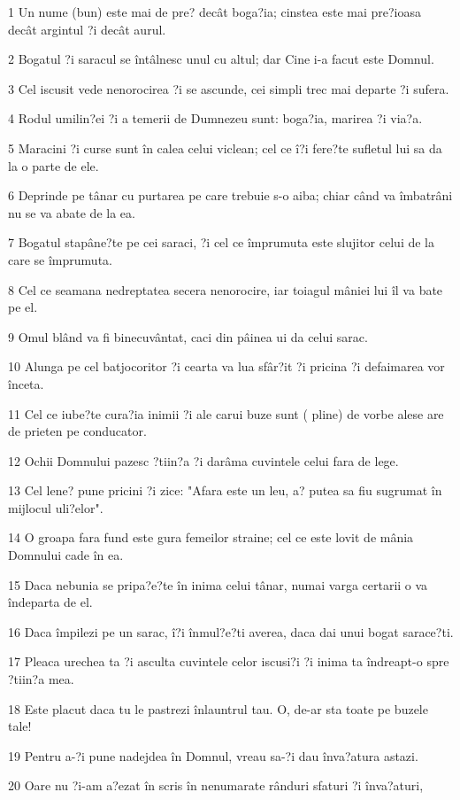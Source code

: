 \par 1 Un nume (bun) este mai de pre? decât boga?ia; cinstea este mai pre?ioasa decât argintul ?i decât aurul.
\par 2 Bogatul ?i saracul se întâlnesc unul cu altul; dar Cine i-a facut este Domnul.
\par 3 Cel iscusit vede nenorocirea ?i se ascunde, cei simpli trec mai departe ?i sufera.
\par 4 Rodul umilin?ei ?i a temerii de Dumnezeu sunt: boga?ia, marirea ?i via?a.
\par 5 Maracini ?i curse sunt în calea celui viclean; cel ce î?i fere?te sufletul lui sa da la o parte de ele.
\par 6 Deprinde pe tânar cu purtarea pe care trebuie s-o aiba; chiar când va îmbatrâni nu se va abate de la ea.
\par 7 Bogatul stapâne?te pe cei saraci, ?i cel ce împrumuta este slujitor celui de la care se împrumuta.
\par 8 Cel ce seamana nedreptatea secera nenorocire, iar toiagul mâniei lui îl va bate pe el.
\par 9 Omul blând va fi binecuvântat, caci din pâinea ui da celui sarac.
\par 10 Alunga pe cel batjocoritor ?i cearta va lua sfâr?it ?i pricina ?i defaimarea vor înceta.
\par 11 Cel ce iube?te cura?ia inimii ?i ale carui buze sunt ( pline) de vorbe alese are de prieten pe conducator.
\par 12 Ochii Domnului pazesc ?tiin?a ?i darâma cuvintele celui fara de lege.
\par 13 Cel lene? pune pricini ?i zice: "Afara este un leu, a? putea sa fiu sugrumat în mijlocul uli?elor".
\par 14 O groapa fara fund este gura femeilor straine; cel ce este lovit de mânia Domnului cade în ea.
\par 15 Daca nebunia se pripa?e?te în inima celui tânar, numai varga certarii o va îndeparta de el.
\par 16 Daca împilezi pe un sarac, î?i înmul?e?ti averea, daca dai unui bogat sarace?ti.
\par 17 Pleaca urechea ta ?i asculta cuvintele celor iscusi?i ?i inima ta îndreapt-o spre ?tiin?a mea.
\par 18 Este placut daca tu le pastrezi înlauntrul tau. O, de-ar sta toate pe buzele tale!
\par 19 Pentru a-?i pune nadejdea în Domnul, vreau sa-?i dau înva?atura astazi.
\par 20 Oare nu ?i-am a?ezat în scris în nenumarate rânduri sfaturi ?i înva?aturi,
